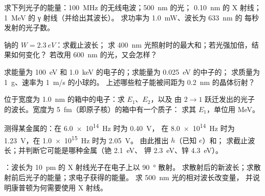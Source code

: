 \begin{exercise}[$\star$]\label{exo:b1:quantum-introduction:1}
求下列光子的能量：\qty{100}{MHz} 的无线电波；\qty{500}{nm} 的光；
\qty{0.10}{nm} 的 X 射线；\qty{1}{MeV} 的 γ 射线（并给出其波长）。
求功率为 \qty{1.0}{mW}、波长为 \qty{633}{nm} 的
每秒发射的光子数。
\end{exercise}

\begin{exercise}[$\star$]\label{exo:b1:quantum-introduction:2}
钠的 $W = \qty{2.3}{eV}$：求截止波长；
求 \qty{400}{nm} 光照射时的最大和；若光强加倍，结果如何变化？
若改用 \qty{600}{nm} 的光，又会怎样？
\end{exercise}

\begin{exercise}[$\star$]\label{exo:b1:quantum-introduction:3}
求能量为 \qty{100}{eV} 和 \qty{1.0}{keV} 的电子的；求能量为 \qty{0.025}{eV} 的中子的；
求质量为 \qty{1}{g}、速率为 \qty{1}{m/s} 的小球的。
上述哪些粒子能被间距为 \qty{0.2}{nm} 的晶体衍射？
\end{exercise}

\begin{exercise}[$\star$]\label{exo:b1:quantum-introduction:4}
位于宽度为 \qty{1.0}{nm} 的箱中的电子：求 $E_1$、$E_2$，以及
由 $2 \to 1$ 跃迁发出的光子的波长。宽度为 \qty{5}{fm}（即原子核）的箱中有一个质子：
求其 $E_1$，单位用 \unit{MeV}。
\end{exercise}

\begin{exercise}[$\star\star$]\label{exo:b1:quantum-introduction:5}
测得某金属的：在 \qty{6.0e14}{Hz} 时为 \qty{0.40}{V}，
在 \qty{8.0e14}{Hz} 时为 \qty{1.23}{V}，在 \qty{1.0e15}{Hz} 时为 \qty{2.05}{V}。
由此推出 $h$（已知 $e$）和；
求截止波长；并判断它可能是哪种金属（铯 \qty{2.1}{eV}、
钾 \qty{2.3}{eV}、锌 \qty{4.3}{eV}）。
\end{exercise}

\begin{exercise}[$\star\star$]\label{exo:b1:quantum-introduction:6}
：波长为 \qty{10}{pm} 的 X 射线光子在电子上以 \qty{90}{\degree} 散射。
求散射后的新波长；求散射前后光子的能量；求电子获得的能量。
求 \qty{500}{nm} 光的相对波长改变量，
并说明康普顿为何需要使用 X 射线。
\end{exercise}

